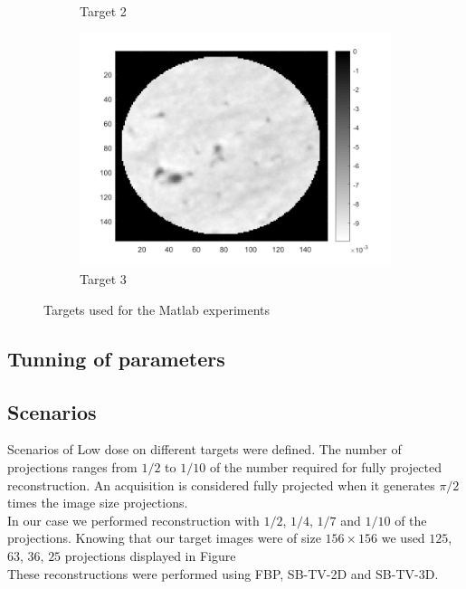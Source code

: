 \begin{figure}[ht!]
\begin{subfigure}[b]{0.30\textwidth}
            \caption{Target 2}
        \end{subfigure}
        \hfill
        \begin{subfigure}[b]{0.30\textwidth}  
            \centering 
            \includegraphics[width=\textwidth]{../../data/res/target3.png}
            \caption{Target 3}
        \end{subfigure}
        \caption{Targets used for the Matlab experiments}
        \label{Fig:Targets}
\end{figure}

\subsection{Tunning of parameters}

\subsection{Scenarios}
Scenarios of Low dose on different targets were defined. The number of projections ranges from $1/2$ to $1/10$ of the number required for fully projected reconstruction.
An acquisition is considered fully projected when it generates $\pi / 2$ times the image size projections.\\
In our case we performed reconstruction with $1/2$, $1/4$, $1/7$ and $1/10$ of the projections. Knowing that our target images were of size $156 \times 156$ we used $125$, $63$, $36$, $25$ projections displayed in Figure\\%
These reconstructions were performed using FBP, SB-TV-2D and SB-TV-3D.

